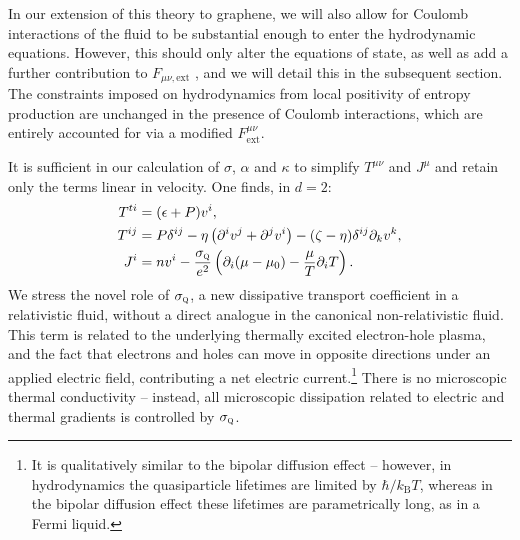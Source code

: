 In our extension of this theory to graphene, we will also allow for Coulomb interactions of the fluid to be substantial enough to enter the hydrodynamic equations.  However, this should only alter the equations of state, as well as add a further contribution to $F_{\mu\nu,\mathrm{ext}}$ \cite{muller_collective_2008}, and we will detail this in the subsequent section.   The constraints imposed on hydrodynamics from local positivity of entropy production \cite{hartnoll_theory_2007} are unchanged in the presence of Coulomb interactions, which are entirely accounted for via a modified $F_{\mathrm{ext}}^{\mu\nu}$.

It is sufficient in our calculation of $\sigma$, $\alpha$ and $\kappa$ to simplify $T^{\mu\nu}$ and $J^\mu$ and retain only the terms linear in velocity.   One finds, in $d=2$: \begin{subequations}\label{eq:AL_smallvhyd}\begin{align}
T^{ti} &= (\epsilon+P) v^i, \\
T^{ij} &= P\delta^{ij} - \eta \left(\partial^i v^j + \partial^j v^i\right) - (\zeta-\eta)\delta^{ij} \partial_k v^k, \\
J^i &= nv^i - \frac{\sigma_{\textsc{q}}}{e^2} \left(\partial_i (\mu - \mu_0)  - \frac{\mu}{T}\partial_i T \right).
\end{align}
\end{subequations}
We stress the novel role of $\sigma_{\textsc{q}}$, a new dissipative transport coefficient in a relativistic fluid, without a direct analogue in the canonical non-relativistic fluid.   This term is related to the underlying thermally excited electron-hole plasma, and the fact that electrons and holes can move in opposite directions under an applied electric field, contributing a net electric current.\footnote{It is qualitatively similar to the bipolar diffusion effect \cite{nolas_thermal_2004, yoshino_significant_2015} -- however, in hydrodynamics the quasiparticle lifetimes are limited by $\hbar/k_{\mathrm{B}}T$, whereas in the bipolar diffusion effect these lifetimes are parametrically long, as in a Fermi liquid.}  There is no microscopic thermal conductivity -- instead, all microscopic dissipation related to electric and thermal gradients is controlled by $\sigma_{\textsc{q}}$.  

